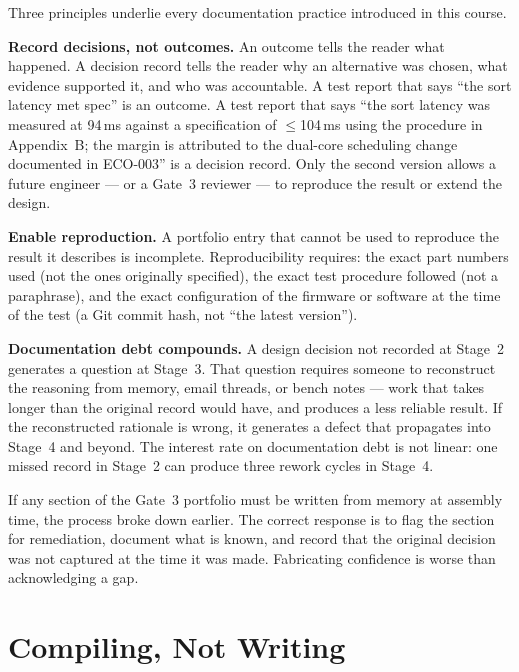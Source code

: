 Three principles underlie every documentation practice introduced in this
course.

\textbf{Record decisions, not outcomes.}
An outcome tells the reader what happened.
A decision record tells the reader why an alternative was chosen, what evidence
supported it, and who was accountable.
A test report that says ``the sort latency met spec'' is an outcome.
A test report that says ``the sort latency was measured at 94\,ms against a
specification of $\leq$104\,ms using the procedure in Appendix~B; the margin is
attributed to the dual-core scheduling change documented in ECO-003'' is a
decision record.
Only the second version allows a future engineer --- or a Gate~3 reviewer --- to
reproduce the result or extend the design.

\textbf{Enable reproduction.}
A portfolio entry that cannot be used to reproduce the result it describes is
incomplete.
Reproducibility requires: the exact part numbers used (not the ones originally
specified), the exact test procedure followed (not a paraphrase), and the exact
configuration of the firmware or software at the time of the test (a Git commit
hash, not ``the latest version'').

\textbf{Documentation debt compounds.}
A design decision not recorded at Stage~2 generates a question at Stage~3.
That question requires someone to reconstruct the reasoning from memory, email
threads, or bench notes --- work that takes longer than the original record would
have, and produces a less reliable result.
If the reconstructed rationale is wrong, it generates a defect that propagates
into Stage~4 and beyond.
The interest rate on documentation debt is not linear: one missed record in
Stage~2 can produce three rework cycles in Stage~4.

\medskip
If any section of the Gate~3 portfolio must be written from memory at assembly
time, the process broke down earlier.
The correct response is to flag the section for remediation, document what is
known, and record that the original decision was not captured at the time it was
made.
Fabricating confidence is worse than acknowledging a gap.

\section{Compiling, Not Writing}
\label{sec:ch16-compiling}

